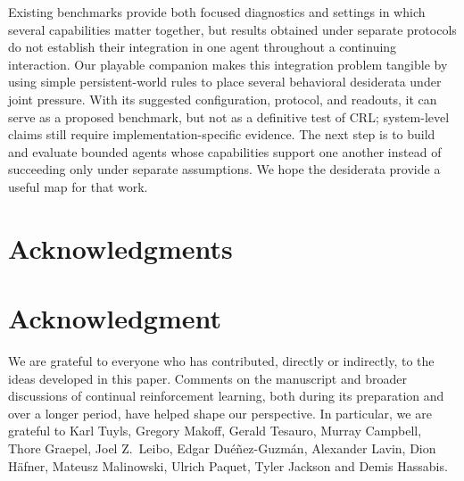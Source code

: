 \documentclass[10pt,journal,compsoc]{IEEEtran}
\newif\ifincludepilotprompts
\begin{document}
Existing benchmarks provide both focused diagnostics and settings in which several capabilities matter together, but results obtained under separate protocols do not establish their integration in one agent throughout a continuing interaction.
Our playable companion makes this integration problem tangible by using simple persistent-world rules to place several behavioral desiderata under joint pressure.
With its suggested configuration, protocol, and readouts, it can serve as a proposed benchmark, but not as a definitive test of CRL; system-level claims still require implementation-specific evidence.
The next step is to build and evaluate bounded agents whose capabilities support one another instead of succeeding only under separate assumptions.
We hope the desiderata provide a useful map for that work.

\ifCLASSOPTIONcompsoc
    \section*{Acknowledgments}
\else
    \section*{Acknowledgment}
\fi

We are grateful to everyone who has contributed, directly or indirectly, to the ideas developed in this paper.
Comments on the manuscript and broader discussions of continual reinforcement learning, both during its preparation and over a longer period, have helped shape our perspective.
In particular, we are grateful to Karl Tuyls, Gregory Makoff, Gerald Tesauro, Murray Campbell, Thore Graepel, Joel Z.~Leibo, Edgar Du\'{e}\~{n}ez-Guzm\'{a}n, Alexander Lavin, Dion H\"{a}fner, Mateusz Malinowski, Ulrich Paquet, Tyler Jackson and Demis Hassabis.




\ifincludepilotprompts
    \clearpage
    \appendices
    
\fi
\end{document}
